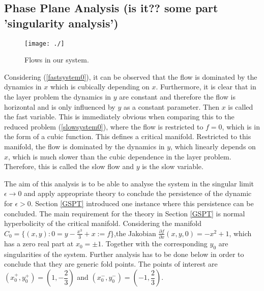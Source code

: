 \subsection{Phase Plane Analysis (is it?? some part 'singularity analysis')}
\begin{figure}[h!]\centering
	\texttt{[image: ./]}
	\caption{Flows in our \vdp system.}
	\label{\ref{fig: vdp flow diagram}}
\end{figure}
Considering (\ref{fastsystem0}), it can be observed that the flow is dominated by the dynamics in $x$ which is cubically depending on $x$.
Furthermore, it is clear that in the layer problem the dynamics in $y$ are constant and therefore the flow is horizontal and is only influenced by $y$ as a constant parameter. Then $x$ is called the fast variable.
This is immediately obvious when comparing this to the reduced problem (\ref{slowsystem0}), where the flow is restricted to $f=0$, which is in the form of a cubic function. This defines a critical manifold. Restricted to this manifold, the flow is dominated by the dynamics in $y$, which linearly depends on $x$, which is much slower than the cubic dependence in the layer problem. Therefore, this is called the slow flow and $y$ is the slow variable. 

The aim of this analysis is to be able to analyse the system in the singular limit $\epsilon \to 0$ and apply appropriate theory to conclude the persistence of the dynamic for $\epsilon > 0$. 
Section \ref{GSPT} introduced one instance where this persistence can be concluded.
The main requirement for the theory in Section \ref{GSPT} is normal hyperbolicity of the critical manifold.
Considering the manifold $C_0= \{ (x,y) : 0=y-\frac{x^3}{3}+x:=f \}$,the Jakobian $\frac{ \partial f}{\partial x}(x,y,0) = -x^2 + 1$, which has a zero real part at $x_0= \pm 1$. Together with the corresponding $y_0$ are singularities of the system.
Further analysis has to be done below in order to conclude that they are generic fold points.
The points of interest are $(x_0^+,y_0^+)=(1,-\dfrac{2}{3})$ and $(x_0^-,y_0^-)=(-1,\dfrac{2}{3})$.

